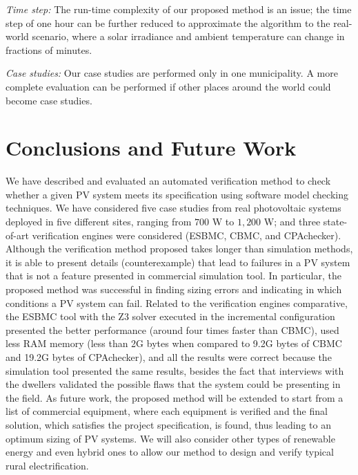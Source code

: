 \documentclass[review]{elsarticle}
\begin{document}
\textit{Time step:} The run-time complexity of our proposed method is an issue; the time step of one hour can be further reduced to approximate the algorithm to the real-world scenario, where a solar irradiance and ambient temperature can change in fractions of minutes.

\textit{Case studies:} Our case studies are performed only in one municipality. A more complete evaluation can be performed if other places around the world could become case studies.

\section{Conclusions and Future Work}
\label{sec:Conclusions}
We have described and evaluated an automated verification method to check whether a given PV system meets its specification using software model checking techniques. We have considered five case studies from real photovoltaic systems deployed in five different sites, ranging from $700$ W to $1,200$ W; and three state-of-art verification engines were considered (ESBMC, CBMC, and CPAchecker). Although the verification method proposed takes longer than simulation methods, it is able to present details (counterexample) that lead to failures in a PV system that is not a feature presented in commercial simulation tool. In particular, the proposed method was successful in finding sizing errors and indicating in which conditions a PV system can fail. Related to the verification engines comparative, the ESBMC tool with the Z3 solver executed in the incremental configuration presented the better performance (around four times faster than CBMC), used less RAM memory (less than 2G bytes when compared to 9.2G bytes of CBMC and 19.2G bytes of CPAchecker), and all the results were correct because the simulation tool presented the same results, besides the fact that interviews with the dwellers validated the possible flaws that the system could be presenting in the field.
As future work, the proposed method will be extended to start from a list of commercial equipment, where each equipment is verified and the final solution, which satisfies the project specification, is found, thus leading to an optimum sizing of PV systems. We will also consider other types of renewable energy and even hybrid ones to allow our method to design and verify typical rural electrification.
\end{document}
